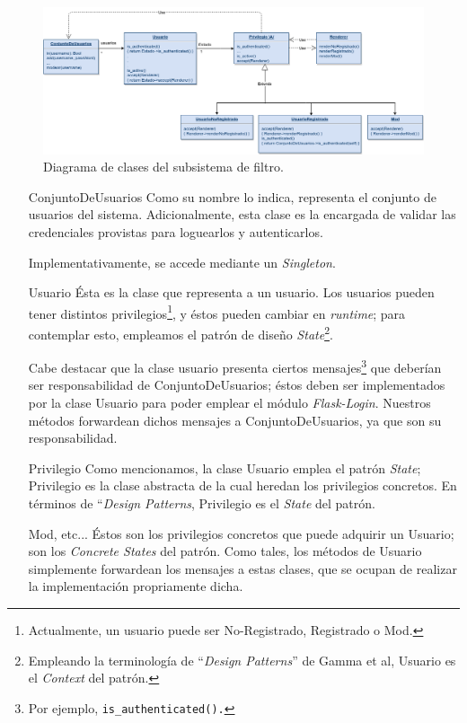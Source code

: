 \begin{figure}[H]
  \centering
  \includegraphics[width=\textwidth]{diagramas/usuario_clases.png}
  \caption{\normalfont Diagrama de clases del subsistema de filtro.}
\end{figure}

\begin{itemize}
\item[ConjuntoDeUsuarios] Como su nombre lo indica, representa el conjunto de usuarios del sistema. Adicionalmente, esta clase es la encargada de validar las credenciales provistas para loguearlos y autenticarlos.
    \par Implementativamente, se accede mediante un \textit{Singleton}.
\item[Usuario] Ésta es la clase que representa a un usuario. 
    Los usuarios pueden tener distintos privilegios\footnote{Actualmente, un usuario puede ser No-Registrado, Registrado o Mod.}, y éstos pueden cambiar en \textit{runtime}; para contemplar esto, empleamos el patrón de diseño \textit{State}\footnote{Empleando la terminología de ``\textit{Design Patterns}'' de Gamma et al, Usuario es el \textit{Context} del patrón.}.
        \par Cabe destacar que la clase usuario presenta ciertos mensajes\footnote{Por ejemplo, \tt{is\_authenticated()}.} que deberían ser responsabilidad de ConjuntoDeUsuarios; éstos deben ser implementados por la clase Usuario para poder emplear el módulo \textit{Flask-Login}.
        Nuestros métodos forwardean dichos mensajes a ConjuntoDeUsuarios, ya que son su responsabilidad.
    \item[Privilegio] Como mencionamos, la clase Usuario emplea el patrón \textit{State}; Privilegio es la clase abstracta de la cual heredan los privilegios concretos. En términos de ``\textit{Design Patterns}, Privilegio es el \textit{State} del patrón.
    \item[Mod, etc...] Éstos son los privilegios concretos que puede adquirir un Usuario; son los \textit{Concrete States} del patrón. Como tales, los métodos de Usuario simplemente forwardean los mensajes a estas clases, que se ocupan de realizar la implementación propriamente dicha.

\end{itemize}
